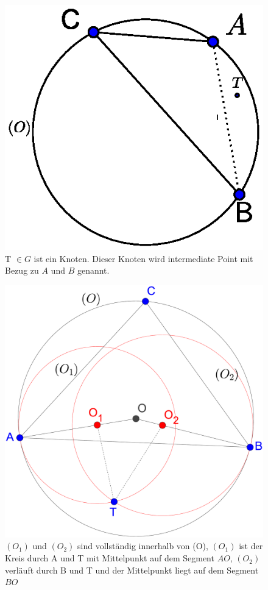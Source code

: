 \documentclass[a4paper,twoside]{IEEEtran}
\begin{document}
\begin{figure}[h!]
\centering
\includegraphics[width=1\linewidth]{outward_path1.eps}
\caption{T $\in G $ ist ein Knoten. Dieser Knoten wird intermediate Point mit Bezug zu $A $ und $B $ genannt.}
\label{fig:intermediate}
\end{figure}

\begin{figure}[h!]
\centering
\includegraphics[width=0.8\linewidth]{outward_path_kreise.eps}
\caption{ $(O_1) $ und $(O_2) $ sind vollständig innerhalb von (O), $(O_1) $ ist der Kreis durch A und T mit Mittelpunkt auf dem Segment $AO $, $(O_2) $ verläuft durch B und T und der Mittelpunkt liegt auf dem Segment $BO $} 
\label{fig:outward_path_kreise}
\end{figure}
\end{document}

